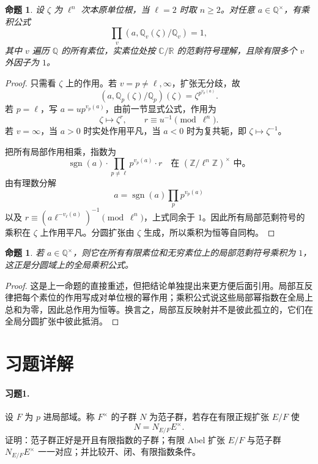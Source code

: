 \documentclass[11pt,a4paper,openany]{ctexbook}
\numberwithin{equation}{chapter}
\newcommand{\Q}{\mathbb{Q}}
\newcommand{\R}{\mathbb{R}}
\newcommand{\C}{\mathbb{C}}
\newcommand{\Z}{\mathbb{Z}}
\theoremstyle{plain}
\newtheorem{proposition}[theorem]{命题}
\theoremstyle{definition}
\theoremstyle{remark}
\begin{document}
\begin{proposition}
设 $\zeta$ 为 $\ell^n$ 次本原单位根，当 $\ell=2$ 时取 $n\ge2$。对任意 $a\in\Q^\times$，有乘积公式
\[
\prod_v (a,\Q_v(\zeta)/\Q_v)=1,
\]
其中 $v$ 遍历 $\Q$ 的所有素位，实素位处按 $\C/\R$ 的范剩符号理解，且除有限多个 $v$ 外因子为 $1$。
\end{proposition}

\begin{proof}
只需看 $\zeta$ 上的作用。若 $v=p\ne \ell,\infty$，扩张无分歧，故
\[
(a,\Q_p(\zeta)/\Q_p)(\zeta)=\zeta^{p^{v_p(a)}}.
\]
若 $p=\ell$，写 $a=up^{v_p(a)}$，由前一节显式公式，作用为
\[
\zeta\longmapsto \zeta^r,\qquad r\equiv u^{-1}\pmod{\ell^n}.
\]
若 $v=\infty$，当 $a>0$ 时实处作用平凡，当 $a<0$ 时为复共轭，即 $\zeta\mapsto \zeta^{-1}$。

把所有局部作用相乘，指数为
\[
\operatorname{sgn}(a)\cdot
\prod_{p\ne\ell}p^{v_p(a)}\cdot r
\quad\text{在 }(\Z/\ell^n\Z)^\times\text{ 中。}
\]
由有理数分解
\[
a=\operatorname{sgn}(a)\prod_p p^{v_p(a)}
\]
以及 $r\equiv (a\ell^{-v_\ell(a)})^{-1}\pmod{\ell^n}$，上式同余于 $1$。因此所有局部范剩符号的乘积在 $\zeta$ 上作用平凡。分圆扩张由 $\zeta$ 生成，所以乘积为恒等自同构。
\end{proof}

\begin{proposition}
若 $a\in\Q^\times$，则它在所有有限素位和无穷素位上的局部范剩符号乘积为 $1$，这正是分圆域上的全局乘积公式。
\end{proposition}

\begin{proof}
这是上一命题的直接重述，但把结论单独提出来更方便后面引用。局部互反律把每个素位的作用写成对单位根的幂作用；乘积公式说这些局部幂指数在全局上总和为零，因此总作用为恒等。换言之，局部互反映射并不是彼此孤立的，它们在全局分圆扩张中彼此抵消。
\end{proof}

\section*{习题详解}

\paragraph{习题1.}
设 $F$ 为 $p$ 进局部域。称 $F^\times$ 的子群 $N$ 为范子群，若存在有限正规扩张 $E/F$ 使
\[
N=N_{E/F}E^\times.
\]
证明：范子群正好是开且有限指数的子群；有限 Abel 扩张 $E/F$ 与范子群 $N_{E/F}E^\times$ 一一对应；并比较开、闭、有限指数条件。
\end{document}
